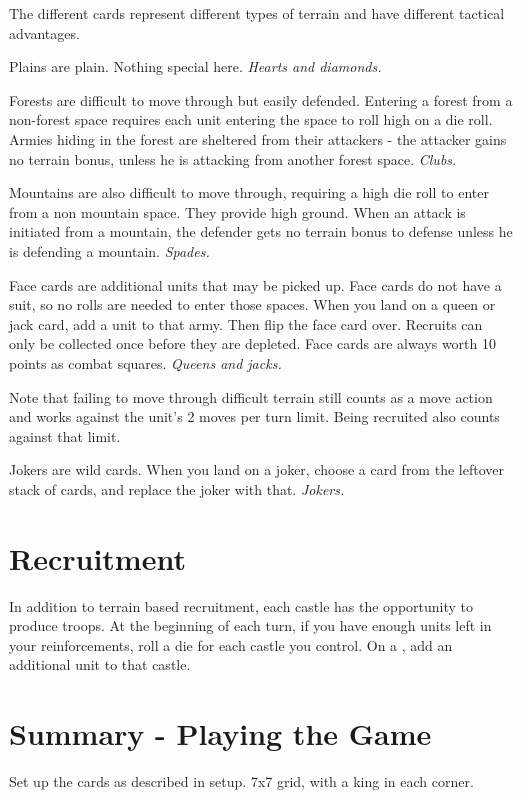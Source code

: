 \documentclass{article}
\begin{document}
The different cards represent different types of terrain and have different tactical advantages.

Plains are plain.  Nothing special here.  \emph{Hearts and diamonds.}

Forests are difficult to move through but easily defended.  Entering a forest from a non-forest space requires each unit entering the space to roll high on a die roll.  Armies hiding in the forest are sheltered from their attackers - the attacker gains no terrain bonus, unless he is attacking from another forest space. \emph{Clubs.}

Mountains are also difficult to move through, requiring a high die roll to enter from a non mountain space.  They provide high ground.  When an attack is initiated from a mountain, the defender gets no terrain bonus to defense unless he is defending a mountain.  \emph{Spades.}

Face cards are additional units that may be picked up.  Face cards do not have a suit, so no rolls are needed to enter those spaces.  When you land on a queen or jack card, add a unit to that army.  Then flip the face card over.  Recruits can only be collected once before they are depleted.  Face cards are always worth 10 points as combat squares.  \emph{Queens and jacks.}

Note that failing to move through difficult terrain still counts as a move action and works against the unit's 2 moves per turn limit.  Being recruited also counts against that limit.

Jokers are wild cards.  When you land on a joker, choose a card from the leftover stack of cards, and replace the joker with that.  \emph{Jokers.}


\section{Recruitment}

In addition to terrain based recruitment, each castle has the opportunity to produce troops.  At the beginning of each turn, if you have enough units left in your reinforcements, roll a die for each castle you control.  On a \recruitroll, add an additional unit to that castle.

\section{Summary - Playing the Game}

Set up the cards as described in setup.  7x7 grid, with a king in each corner.
\end{document}
